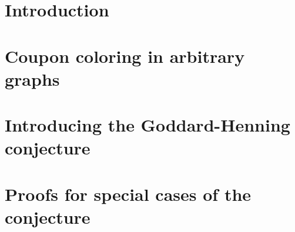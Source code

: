 \documentclass[12pt]{report}
\begin{document}


\newpage\null\thispagestyle{empty}\newpage

\tableofcontents

\chapter*{Introduction}


\chapter{Coupon coloring in arbitrary graphs}


\chapter{Introducing the Goddard-Henning conjecture}


\chapter{Proofs for special cases of the conjecture}



\end{document}
